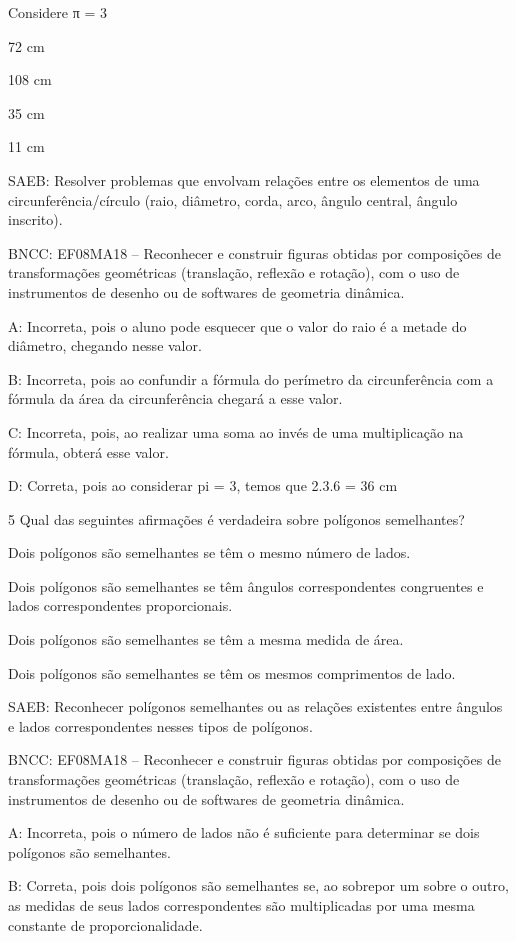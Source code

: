 {Considere π = 3
\item 72 cm
\item 108 cm
\item 35 cm
\item 11 cm

SAEB: Resolver problemas que envolvam relações entre os elementos de uma
circunferência/círculo (raio, diâmetro, corda, arco, ângulo central,
ângulo inscrito).

BNCC: EF08MA18 -- Reconhecer e construir figuras obtidas por composições
de transformações geométricas (translação, reflexão e rotação), com o
uso de instrumentos de desenho ou de softwares de geometria dinâmica.

A: Incorreta, pois o aluno pode esquecer que o valor do raio é a metade
do diâmetro, chegando nesse valor.

B: Incorreta, pois ao confundir a fórmula do perímetro da circunferência
com a fórmula da área da circunferência chegará a esse valor.

C: Incorreta, pois, ao realizar uma soma ao invés de uma multiplicação
na fórmula, obterá esse valor.

D: Correta, pois ao considerar pi = 3, temos que 2.3.6 = 36 cm

\num{5} Qual das seguintes afirmações é verdadeira sobre polígonos
semelhantes?
\item Dois polígonos são semelhantes se têm o mesmo número de lados.
\item Dois polígonos são semelhantes se têm ângulos correspondentes
congruentes e lados correspondentes proporcionais.
\item Dois polígonos são semelhantes se têm a mesma medida de área.
\item Dois polígonos são semelhantes se têm os mesmos comprimentos de lado.

SAEB: Reconhecer polígonos semelhantes ou as relações existentes entre
ângulos e lados correspondentes nesses tipos de polígonos.

BNCC: EF08MA18 -- Reconhecer e construir figuras obtidas por composições
de transformações geométricas (translação, reflexão e rotação), com o
uso de instrumentos de desenho ou de softwares de geometria dinâmica.

A: Incorreta, pois o número de lados não é suficiente para determinar se
dois polígonos são semelhantes.

B: Correta, pois dois polígonos são semelhantes se, ao sobrepor um sobre
o outro, as medidas de seus lados correspondentes são multiplicadas por
uma mesma constante de proporcionalidade.

}
